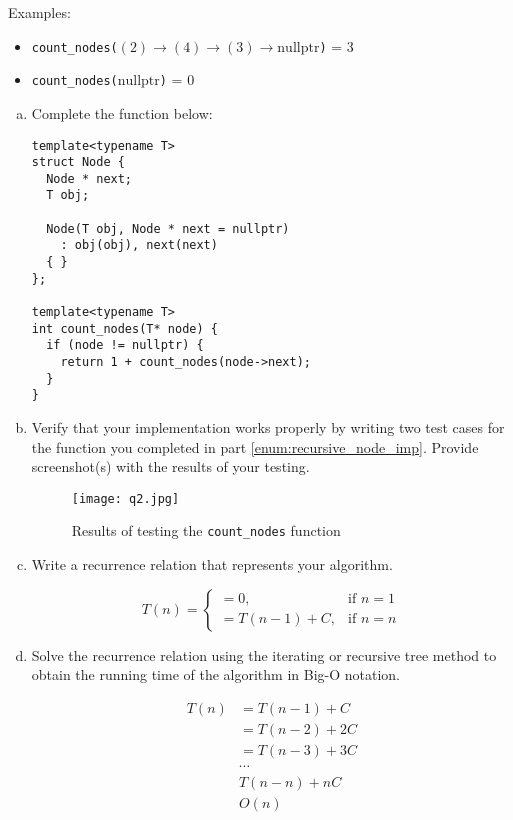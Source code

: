 \documentclass[english]{article}
\newcommand*{\code}[1]{\texttt{#1}}
\begin{document}
Examples:
\begin{itemize}
  \item \code{count\_nodes($ (2) \rightarrow (4) \rightarrow (3) \rightarrow \text{nullptr}$)} = 3
  \item \code{count\_nodes($\text{nullptr}$)} = 0
\end{itemize}

\bigskip

\begin{enumerate}[(a)]
  \item Complete the function below:
  \label{enum:recursive_node_imp}

\begin{lstlisting}
template<typename T>
struct Node {
  Node * next;
  T obj;

  Node(T obj, Node * next = nullptr)
    : obj(obj), next(next)
  { }
};

template<typename T>
int count_nodes(T* node) {
  if (node != nullptr) {
    return 1 + count_nodes(node->next);
  }
}
\end{lstlisting}

  \item Verify that your implementation works properly by writing two test cases for the function you completed in part \ref{enum:recursive_node_imp}. Provide screenshot(s) with the results of your testing.

\begin{figure}[H]
  \centering
  \texttt{[image: q2.jpg]}
  \caption{Results of testing the \code{count\_nodes} function}%
  \label{fig:count_node_tests}
\end{figure}  

  \item Write a recurrence relation that represents your algorithm.
  
  \begin{equation}
    T(n) = \begin{cases}
      = 0, & \text{if } n = 1 \\
      = T(n - 1) + C, & \text{if } n = n
    \end{cases}
  \end{equation}

  \item Solve the recurrence relation using the iterating or recursive tree method to obtain the running time of the algorithm in Big-O notation.

  \begin{align}
    T(n) &= T(n - 1) + C \\
         &= T(n - 2) + 2C \\
         &= T(n - 3) + 3C \\
         & \cdots \\
         & T(n - n) + nC \\
         & O(n)
  \end{align}

\end{enumerate}
\end{document}
